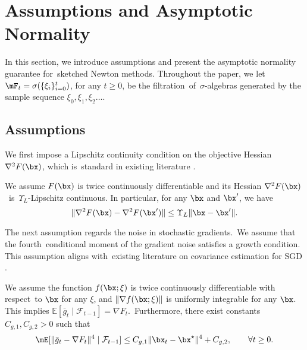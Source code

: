
\section{Assumptions and Asymptotic Normality}\label{sec:3}

In this section, we introduce assumptions and present the asymptotic normality guarantee for~sketched Newton methods. Throughout the paper, we let $\mF_t = \sigma(\{\xi_i\}_{i=0}^t)$, for any $t\geq 0$, be the filtration~of~$\sigma$-algebras generated by the sample sequence $\xi_0, \xi_1,\xi_2\ldots$.

\subsection{Assumptions}\label{sec:3.1}

We first impose a Lipschitz continuity condition on the objective Hessian $\nabla^2  F(\bx)$, which is~standard in existing literature \citep{Bercu2020Efficient, Cenac2020efficient, Na2022Statistical}.

\begin{assumption}\label{ass:1}
We assume $F(\bx)$ is twice continuously differentiable and its Hessian $\nabla^2F(\bx)$~is~$\Upsilon_{L}$-Lipschitz continuous. In particular, for any $\bx$ and $\bx^{\prime}$, we have
\begin{equation*}
\|\nabla^2 F(\bx) - \nabla^2 F(\bx^{\prime})\|\leq \Upsilon_{L}\|\bx-\bx^{\prime}\|.
\end{equation*}
\end{assumption}


The next assumption regards the noise in stochastic gradients.~We assume that the fourth~conditional moment of the gradient noise satisfies a growth condition. This assumption aligns with~existing literature on covariance estimation for SGD \citep{Chen2020Statistical, Zhu2021Online}.


\begin{assumption}\label{ass:2}

We assume the function $f(\bx;\xi)$ is twice continuously differentiable with respect~to $\bx$ for any $\xi$, and $\|\nabla f(\bx;\xi)\|$ is uniformly integrable for any $\bx$. This implies \mbox{$\mathbb{E}[\bar{g}_t\mid \mathcal{F}_{t-1}]=\nabla F_t$}.~Furthermore, there exist constants $C_{g,1}, C_{g,2}>0$ such that
\begin{equation}\label{ass:2:4th}
\mE[\|\bar{g}_t - \nabla F_t\|^4\mid\mathcal{F}_{t-1}]\leq C_{g,1}\|\bx_t-\bx^\star\|^4 + C_{g,2}, \quad\quad \forall t\geq 0.
\end{equation}
\end{assumption}


